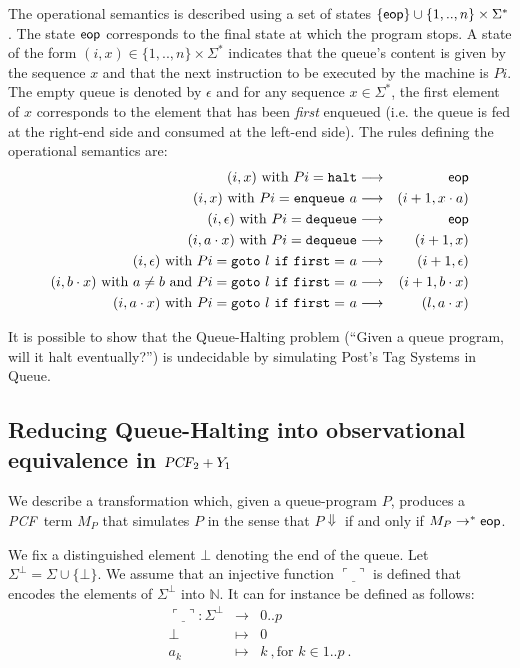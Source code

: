 \documentclass{article}
\newcommand{\encode}[1]{\ulcorner #1 \urcorner}
\newcommand{\nat}{\mathbb{N}}
\newcommand\eop{{\sf eop}}
\newcommand\pcf{\textsl{PCF}}
\begin{document}
The operational semantics is described using a set of states $ \{ \eop \} \cup \{ 1,..,n \} \times \Sigma^* $. The state $\eop$ corresponds to the final state at which the program stops. A state of the form $(i,x) \in \{ 1,..,n \} \times \Sigma^*$ indicates that the queue's content is given by the sequence $x$ and that the next instruction to be executed by the machine is $P i$. The empty queue is denoted by $\epsilon$ and for any sequence $x \in \Sigma^*$, the first element of $x$ corresponds to the element that has been \emph{first} enqueued (i.e. the queue is fed at the right-end side and consumed at the left-end side). The rules defining the operational semantics are:
\begin{eqnarray*}
(i,x) \mbox{ with } P i = {\tt halt} &\longrightarrow& \eop \\
(i,x) \mbox{ with } P i = {\tt enqueue\ } a &\longrightarrow& (i+1,x \cdot a) \\
(i,\epsilon) \mbox{ with } P i = {\tt dequeue } &\longrightarrow& \eop \\
(i,a \cdot x) \mbox{ with } P i = {\tt dequeue } &\longrightarrow& (i+1,x) \\
(i,\epsilon) \mbox{ with } P i =  {\tt goto\ } l {\tt\ if\ first =\ } a &\longrightarrow& (i+1,\epsilon) \\
(i,b \cdot x) \mbox{ with } a \neq b \mbox{ and } P i =  {\tt goto\ } l {\tt\ if\ first =\ } a &\longrightarrow& (i+1,b \cdot x) \\
(i,a \cdot x) \mbox{ with } P i =  {\tt goto\ } l {\tt\ if\ first =\ } a &\longrightarrow& (l,a \cdot x)
\end{eqnarray*}

It is possible to show that the Queue-Halting problem (``Given a queue program, will it halt eventually?'') is undecidable by simulating Post's Tag Systems in Queue.

\subsection{Reducing Queue-Halting into observational equivalence in $\pcf_2 + Y_1$}

We describe a transformation which, given a queue-program $P$, produces a \pcf\ term $M_P$ that simulates $P$ in the sense that $P \Downarrow$ if and only if $M_P \rightarrow^* \eop$.

We fix a distinguished element $\bot$ denoting the end of the queue. Let $\Sigma^\bot = \Sigma \cup \{ \bot \}$. We assume that an injective function $\encode{\underline{\ }}$ is defined that encodes  the
elements of $\Sigma^\bot$ into $\nat$. It can for instance be defined as follows:
\begin{eqnarray*}
\encode{\underline{\ }} : \Sigma^\bot &\longrightarrow& 0..p \\
 \bot &\mapsto& 0 \\
 a_k &\mapsto& k \ , \mbox{for } k \in 1..p \ .
\end{eqnarray*}
\end{document}
